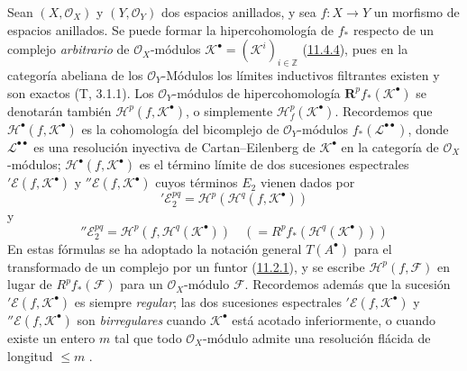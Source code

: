\begin{env}[12.4.1]
\label{0.12.4.1}
\label{0.12.4.1-fr}
Sean $(X,\mathcal O_X)$ y $(Y,\mathcal O_Y)$ dos espacios anillados, y sea
$f:X\to Y$ un morfismo de espacios anillados.
Se puede formar la hipercohomología de $f_*$ respecto de un complejo
\emph{arbitrario} de $\mathcal O_X$-módulos
$\mathcal K^\bullet=(\mathcal K^i)_{i\in\mathbb Z}$
(\hyperref[0.11.4.4-fr]{11.4.4}), pues en la categoría abeliana de los $\mathcal O_Y$-Módulos los límites inductivos filtrantes existen y son exactos (T, 3.1.1). Los $\mathcal O_Y$-módulos de hipercohomología
$\mathbf{R}^p f_*(\mathcal K^\bullet)$ se denotarán también
$\mathscr H^p(f,\mathcal K^\bullet)$, o simplemente
$\mathscr H_f^p(\mathcal K^\bullet)$.
Recordemos que $\mathscr H^\bullet(f,\mathcal K^\bullet)$ es la cohomología del
bicomplejo de $\mathcal O_Y$-módulos $f_*(\mathcal L^{\bullet\bullet})$,
donde $\mathcal L^{\bullet\bullet}$ es una resolución inyectiva de
Cartan--Eilenberg de $\mathcal K^\bullet$ en la categoría de
$\mathcal O_X$-módulos; $\mathscr H^\bullet(f,\mathcal K^\bullet)$ es el término límite de dos sucesiones espectrales ${}'\mathcal E(f,\mathcal K^\bullet)$ y ${}''\mathcal E(f,\mathcal K^\bullet)$ cuyos términos $E_2$
vienen dados por
\begin{equation}
\label{0.12.4.1.1-fr}
\tag{12.4.1.1}
{}'\mathcal E_2^{pq}=\mathcal H^p(\mathcal H^q(f,\mathcal K^\bullet))
\end{equation}
y
\begin{equation}
\label{0.12.4.1.2-fr}
\tag{12.4.1.2}
{}''\mathcal E_2^{pq}=\mathcal H^p(f,\mathcal H^q(\mathcal K^\bullet))
\quad(=R^p f_*(\mathcal H^q(\mathcal K^\bullet)))
\end{equation}
En estas fórmulas se ha adoptado la notación general $T(A^\bullet)$ para el transformado de un complejo por un funtor (\hyperref[0.11.2.1-fr]{11.2.1}), y se escribe
$\mathcal H^p(f,\mathcal F)$ en lugar de $R^p f_*(\mathcal F)$ para un $\mathcal O_X$-módulo $\mathcal F$. Recordemos además que la sucesión ${}'\mathcal E(f,\mathcal K^\bullet)$ es siempre \emph{regular}; las dos sucesiones espectrales ${}'\mathcal E(f,\mathcal K^\bullet)$ y ${}''\mathcal E(f,\mathcal K^\bullet)$ son \emph{birregulares} cuando $\mathcal K^\bullet$ está
acotado inferiormente,
o cuando existe un entero $m$ tal que todo $\mathcal O_X$-módulo
admite una resolución flácida de longitud $\leq m$ .
\end{env}

